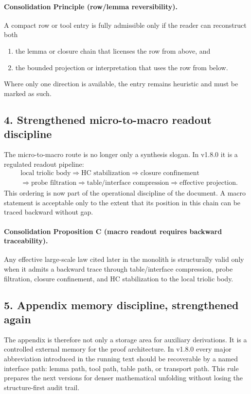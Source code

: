 \paragraph{Consolidation Principle (row/lemma reversibility).}
A compact row or tool entry is fully admissible only if the reader can reconstruct
both
\begin{enumerate}[leftmargin=2em,label=(\alph*)]
  \item the lemma or closure chain that licenses the row from above, and
  \item the bounded projection or interpretation that uses the row from below.
\end{enumerate}
Where only one direction is available, the entry remains heuristic and must be
marked as such.

\subsection*{4. Strengthened micro-to-macro readout discipline}
The micro-to-macro route is no longer only a synthesis slogan. In v1.8.0 it is
a regulated readout pipeline:
\[
\begin{aligned}
&\text{local triolic body} \Longrightarrow \text{HC stabilization} \Longrightarrow \text{closure confinement}\\
&\Longrightarrow \text{probe filtration} \Longrightarrow \text{table/interface compression} \Longrightarrow \text{effective projection}.
\end{aligned}
\]
This ordering is now part of the operational discipline of the document. A macro
statement is acceptable only to the extent that its position in this chain can be
traced backward without gap.

\paragraph{Consolidation Proposition C (macro readout requires backward traceability).}
Any effective large-scale law cited later in the monolith is structurally valid only
when it admits a backward trace through table/interface compression, probe
filtration, closure confinement, and HC stabilization to the local triolic body.

\subsection*{5. Appendix memory discipline, strengthened again}
The appendix is therefore not only a storage area for auxiliary derivations. It is
a controlled external memory for the proof architecture. In v1.8.0 every major
abbreviation introduced in the running text should be recoverable by a named
interface path: lemma path, tool path, table path, or transport path. This rule
prepares the next versions for denser mathematical unfolding without losing the
structure-first audit trail.

